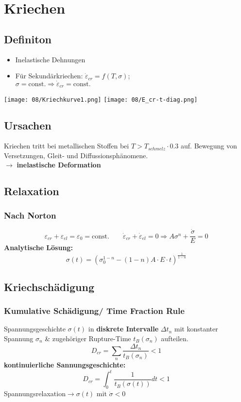 \section{Kriechen}
    \subsection{Definiton}
        \begin{itemize}
            \item Inelastische Dehnungen
            \item Für Sekundärkriechen: $\dot{\varepsilon}_{cr} = f(T,\sigma)$;\\$\sigma = \textrm{const.} \Rightarrow \dot{\varepsilon}_{cr}= \textrm{const.}$
        \end{itemize}
        \vspace{-4mm}
        \texttt{[image: 08/Kriechkurve1.png]}
        \texttt{[image: 08/E\_cr-t-diag.png]}
    \subsection{Ursachen}
        Kriechen tritt bei metallischen Stoffen bei $ T > T_{schmelz} \cdot 0.3  $ auf.
        Bewegung von Versetzungen, Gleit- und Diffussionsphänomene. 
        \\$\rightarrow$ \textbf{inelastische Deformation}
        \vspace{2mm}
    \subsection{Relaxation}
        \subsubsection{Nach Norton}
            \[\varepsilon_{cr}+\varepsilon_{el}=\varepsilon_0=\textrm{const.} \qquad \boxed{\dot{\varepsilon}_{cr}+\dot{\varepsilon}_{el}=0 \Rightarrow A\sigma^n + \frac{\dot{\sigma}}{E}=0}\]
            \textbf{Analytische Lösung:}
            \vspace{-1mm}\[\boxed{\sigma(t)=\left(\sigma_{0}^{1-n}-(1-n)A\cdot E\cdot t\right)^{\frac{1}{1-n}}}\]
            
    \subsection{Kriechschädigung}
        \subsubsection{Kumulative Schädigung/ Time Fraction Rule}
            Spannungsgeschichte $\sigma(t)$ in \textbf{diskrete Intervalle} $\Delta t_n$ mit konstanter Spannung $\sigma_n$ \& zugehöriger Rupture-Time $t_B(\sigma_n)$ aufteilen.
            \[D_{cr}=\sum_n\frac{\Delta t_{n}}{t_B(\sigma_n)} < 1\]
            \textbf{kontinuierliche Sannungsgeschichte:}
            \[\boxed{D_{cr}=\int_0^t\frac{1}{t_B(\sigma(t))}dt < 1}\]
            Spannungsrelaxation$\rightarrow \sigma(t)$ mit $\dot{\sigma}<0$
            
